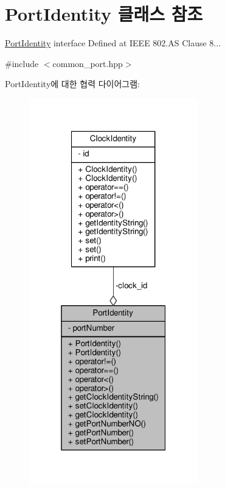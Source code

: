 \hypertarget{class_port_identity}{}\section{Port\+Identity 클래스 참조}
\label{class_port_identity}


\hyperlink{class_port_identity}{Port\+Identity} interface Defined at I\+E\+EE 802.\+AS Clause 8...  




{\ttfamily \#include $<$common\+\_\+port.\+hpp$>$}



Port\+Identity에 대한 협력 다이어그램\+:
\nopagebreak
\begin{figure}[H]
\begin{center}
\leavevmode
\includegraphics[width=208pt]{class_port_identity__coll__graph}
\end{center}
\end{figure}
